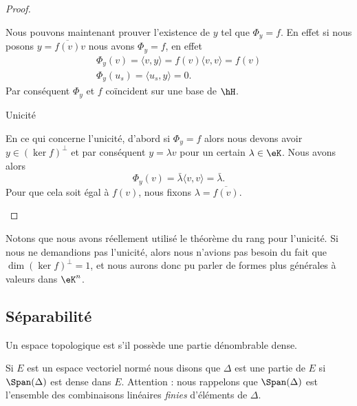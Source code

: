 \begin{proof}
\begin{subproof}
    Nous pouvons maintenant prouver l'existence de \( y\) tel que \(  \Phi_y= f\). En effet si nous posons \( y=\overline{  f(v) }v\) nous avons \(  \Phi_y= f\), en effet
    \begin{subequations}
        \begin{align}
             \Phi_y(v)=\langle v, y\rangle = f(v)\langle v, v\rangle = f(v)\\
             \Phi_y(u_s)=\langle u_s, y\rangle =0.
        \end{align}
    \end{subequations}
    Par conséquent \(  \Phi_y\) et \(  f\) coïncident sur une base de \( \hH\).

\item[Unicité]

    En ce qui concerne l'unicité, d'abord si \(  \Phi_y= f\) alors nous devons avoir \( y\in(\ker f)^{\perp}\) et par conséquent \( y=\lambda v\) pour un certain \( \lambda\in \eK\). Nous avons alors
    \begin{equation}
         \Phi_y(v)=\bar\lambda\langle v, v\rangle =\bar\lambda.
    \end{equation}
    Pour que cela soit égal à \(  f(v)\), nous fixons \( \lambda=\overline{  f(v) }\).
    \end{subproof}
    
\end{proof}
Notons que nous avons réellement utilisé le théorème du rang pour l'unicité. Si nous ne demandions pas l'unicité, alors nous n'avions pas besoin du fait que \( \dim(\ker f)^{\perp}=1\), et nous aurons donc pu parler de formes plus générales à valeurs dans \( \eK^n\).

\subsection{Séparabilité}

\begin{definition}      \label{DEFooSFOJooGICSbT}
    Un espace topologique est  s'il possède une partie dénombrable dense.
\end{definition}

\begin{definition}      \label{DEFooQVPHooJaSWyF}
    Si \( E\) est un espace vectoriel normé nous disons que \( \Delta\) est une partie  de \( E\) si \( \Span(\Delta)\) est dense dans \( E\). Attention : nous rappelons que \( \Span(\Delta)\) est l'ensemble des combinaisons linéaires \emph{finies} d'éléments de \( \Delta\).
\end{definition}

